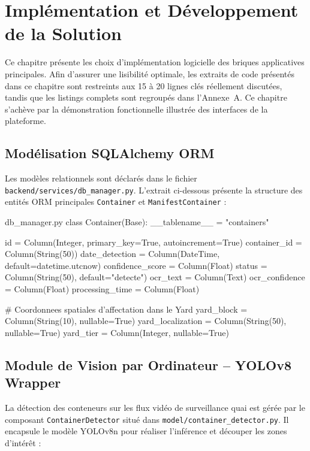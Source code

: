 \documentclass[12pt,a4paper]{article}
\begin{document}
\section{Implémentation et Développement de la Solution}

Ce chapitre présente les choix d'implémentation logicielle des briques applicatives principales. Afin d'assurer une lisibilité optimale, les extraits de code présentés dans ce chapitre sont restreints aux 15 à 20 lignes clés réellement discutées, tandis que les listings complets sont regroupés dans l'Annexe~A. Ce chapitre s'achève par la démonstration fonctionnelle illustrée des interfaces de la plateforme.

\subsection{Modélisation SQLAlchemy ORM}

Les modèles relationnels sont déclarés dans le fichier \texttt{backend/services/db\_manager.py}. L'extrait ci-dessous présente la structure des entités ORM principales \texttt{Container} et \texttt{ManifestContainer} :

\begin{vscodeWindow}{db\_manager.py}
class Container(Base):
    __tablename__ = "containers"

    id               = Column(Integer, primary_key=True, autoincrement=True)
    container_id     = Column(String(50))
    date_detection   = Column(DateTime, default=datetime.utcnow)
    confidence_score = Column(Float)
    status           = Column(String(50), default="detecte")
    ocr_text         = Column(Text)
    ocr_confidence   = Column(Float)
    processing_time  = Column(Float)
    
    # Coordonnees spatiales d'affectation dans le Yard
    yard_block        = Column(String(10), nullable=True)
    yard_localization = Column(String(50), nullable=True)
    yard_tier         = Column(Integer, nullable=True)
\end{vscodeWindow}

\subsection{Module de Vision par Ordinateur -- YOLOv8 Wrapper}

La détection des conteneurs sur les flux vidéo de surveillance quai est gérée par le composant \texttt{ContainerDetector} situé dans \texttt{model/container\_detector.py}. Il encapsule le modèle YOLOv8n pour réaliser l'inférence et découper les zones d'intérêt :
\end{document}
